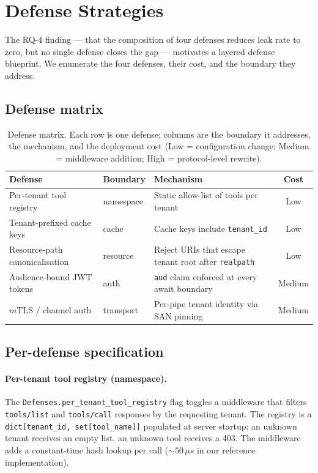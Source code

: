 
\section{Defense Strategies}\label{sec:defenses}

The RQ-4 finding --- that the composition of four defenses
reduces leak rate to zero, but no single defense closes the gap
--- motivates a layered defense blueprint. We enumerate the
four defenses, their cost, and the boundary they address.

\subsection{Defense matrix}

\begin{table}[t]
\caption{Defense matrix. Each row is one defense; columns are
the boundary it addresses, the mechanism, and the deployment
cost (Low = configuration change; Medium = middleware
addition; High = protocol-level rewrite).}
\label{tab:defense-matrix}
\centering
\small
\begin{tabularx}{\linewidth}{l l X c}
\toprule
Defense & Boundary & Mechanism & Cost \\
\midrule
Per-tenant tool registry         & namespace    & Static allow-list of tools per tenant                              & Low \\
Tenant-prefixed cache keys      & cache        & Cache keys include \texttt{tenant\_id}                             & Low \\
Resource-path canonicalisation  & resource     & Reject URIs that escape tenant root after \texttt{realpath}        & Low \\
Audience-bound JWT tokens       & auth         & \texttt{aud} claim enforced at every await boundary               & Medium \\
$m$TLS / channel auth           & transport    & Per-pipe tenant identity via SAN pinning                           & Medium \\
\bottomrule
\end{tabularx}
\end{table}

\subsection{Per-defense specification}

\paragraph{Per-tenant tool registry (namespace).} The
\texttt{Defenses.per\_tenant\_tool\_registry} flag toggles a
middleware that filters \texttt{tools/list} and
\texttt{tools/call} responses by the requesting tenant. The
registry is a \texttt{dict[tenant\_id, set[tool\_name]]}
populated at server startup; an unknown tenant receives an
empty list, an unknown tool receives a 403. The middleware
adds a constant-time hash lookup per call ($\sim 50\,\mu s$ in
our reference implementation).

